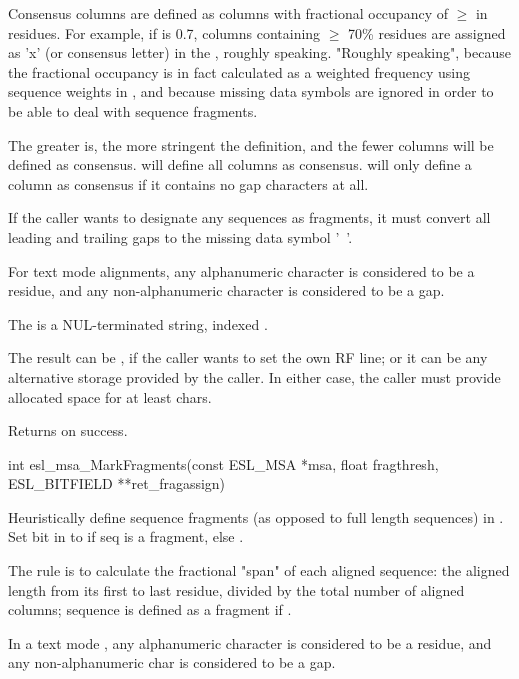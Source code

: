 \begin{sreapi}
Consensus columns are defined as columns with fractional
occupancy of $\geq$  in residues. For example,
if  is 0.7, columns containing $\geq$ 70\%
residues are assigned as 'x' (or consensus letter) in the
, roughly speaking. "Roughly speaking", because the
fractional occupancy is in fact calculated as a weighted
frequency using sequence weights in , and because
missing data symbols are ignored in order to be able to
deal with sequence fragments. 

The greater  is, the more stringent the
definition, and the fewer columns will be defined as
consensus.  will define all columns as
consensus.  will only define a column as
consensus if it contains no gap characters at all.

If the caller wants to designate any sequences as
fragments, it must convert all leading and trailing gaps
to the missing data symbol '~'.

For text mode alignments, any alphanumeric character is
considered to be a residue, and any non-alphanumeric
character is considered to be a gap.

The  is a NUL-terminated string, indexed
.

The  result can be , if the caller
wants to set the  own RF line; or it can be any
alternative storage provided by the caller. In either
case, the caller must provide allocated space for at
least  chars.

Returns  on success.



\hypertarget{func:esl_msa_MarkFragments()}
{\item[int esl\_msa\_MarkFragments(const ESL\_MSA *msa, float fragthresh, ESL\_BITFIELD **ret\_fragassign)]}

Heuristically define sequence fragments (as opposed to
full length sequences) in . Set bit  in 
to  if seq  is a fragment, else .

The rule is to calculate the fractional "span" of each
aligned sequence: the aligned length from its first to
last residue, divided by the total number of aligned
columns; sequence is defined as a fragment if .

In a text mode , any alphanumeric character is
considered to be a residue, and any non-alphanumeric
char is considered to be a gap.


\end{sreapi}
